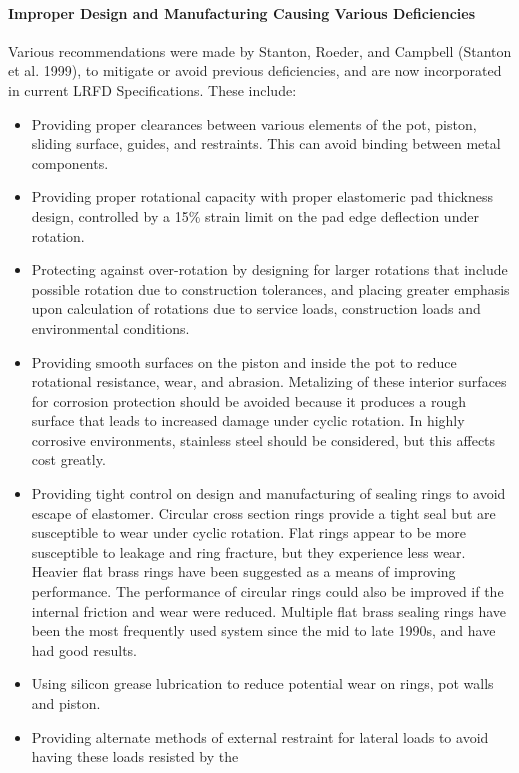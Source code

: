 \paragraph{Improper Design and Manufacturing Causing Various Deficiencies}
Various recommendations were made by Stanton, Roeder, and Campbell (Stanton et al. 1999), to mitigate or
avoid previous deficiencies, and are now incorporated in current LRFD Specifications. These include:
\begin{itemize}
  \item Providing proper clearances between various elements of the pot, piston, sliding surface, guides, and
  restraints. This can avoid binding between metal components.
  \item Providing proper rotational capacity with proper elastomeric pad thickness design, controlled by a 15\% strain
  limit on the pad edge deflection under rotation.
  \item Protecting against over-rotation by designing for larger rotations that include possible rotation due to
  construction tolerances, and placing greater emphasis upon calculation of rotations due to service loads,
  construction loads and environmental conditions.
  \item Providing smooth surfaces on the piston and inside the pot to reduce rotational resistance, wear, and
  abrasion. Metalizing of these interior surfaces for corrosion protection should be avoided because it produces
  a rough surface that leads to increased damage under cyclic rotation. In highly corrosive environments,
  stainless steel should be considered, but this affects cost greatly.
  \item Providing tight control on design and manufacturing of sealing rings to avoid escape of elastomer. Circular
  cross section rings provide a tight seal but are susceptible to wear under cyclic rotation. Flat rings appear to
  be more susceptible to leakage and ring fracture, but they experience less wear. Heavier flat brass rings have
  been suggested as a means of improving performance. The performance of circular rings could also be
  improved if the internal friction and wear were reduced. Multiple flat brass sealing rings have been the most
  frequently used system since the mid to late 1990s, and have had good results.
  \item Using silicon grease lubrication to reduce potential wear on rings, pot walls and piston.
  \item Providing alternate methods of external restraint for lateral loads to avoid having these loads resisted by the

\end{itemize}
